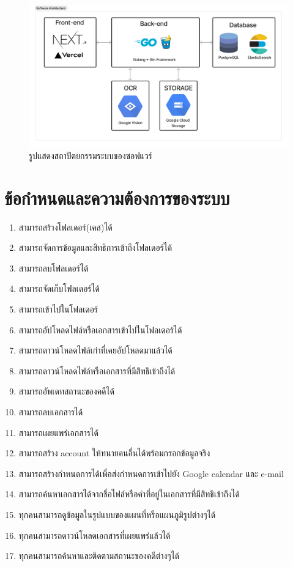 \documentclass[12pt,oneside,openright,a4paper]{cpe-thai-project}
\begin{document}
\begin{figure}[!h]\centering
  \includegraphics[width=13cm]{./assets/software_architecture.png}
  \caption{รูปแสดงสถาปัตยกรรมระบบของซอฟแวร์}\label{fig:systemArch}
\end{figure}

\newpage
\section{ข้อกำหนดและความต้องการของระบบ}
\begin{enumerate}
  \item สามารถสร้างโฟลเดอร์(เคส)ได้
  \item สามารถจัดการข้อมูลและสิทธิการเข้าถึงโฟลเดอร์ได้
  \item สามารถลบโฟลเดอร์ได้
  \item สามารถจัดเก็บโฟลเดอร์ได้
  \item สามารถเข้าไปในโฟลเดอร์
  \item สามารถอัปโหลดไฟล์หรือเอกสารเข้าไปในโฟลเดอร์ได้
  \item สามารถดาวน์โหลดไฟล์เก่าที่เคยอัปโหลดมาแล้วได้
  \item สามารถดาวน์โหลดไฟล์หรือเอกสารที่มีสิทธิเข้าถึงได้
  \item สามารถอัพเดทสถานะของคดีได้
  \item สามารถลบเอกสารได้
  \item สามารถเผยแพร่เอกสารได้
  \item สามารถสร้าง account ให้ทนายคนอื่นได้พร้อมกรอกข้อมูลจริง
  \item สามารถสร้างกําหนดการได้เพื่อส่งกําหนดการเข้าไปยัง Google calendar และ  e-mail
  \item สามารถค้นหาเอกสารได้จากชื่อไฟล์หรือคําที่อยู่ในเอกสารที่มีสิทธิเข้าถึงได้
  \item ทุกคนสามารถดูข้อมูลในรูปแบบของแผนที่หรือแผนภูมิรูปต่างๆได้
  \item ทุกคนสามารถดาวน์โหลดเอกสารที่เผยแพร่แล้วได้
  \item ทุกคนสามารถค้นหาและติดตามสถานะของคดีต่างๆได้
\end{enumerate}
\end{document}
